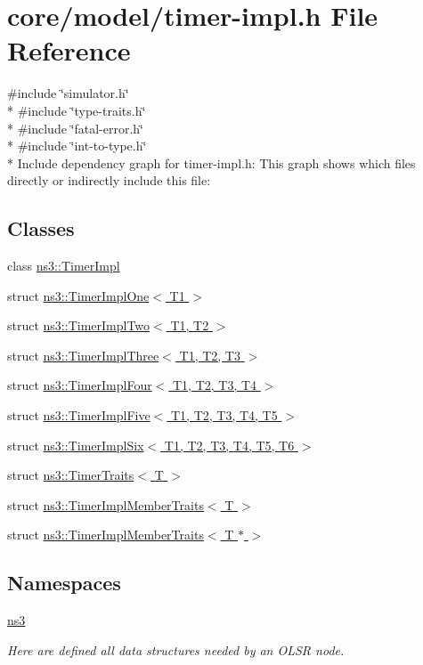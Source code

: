\hypertarget{timer-impl_8h}{}\section{core/model/timer-\/impl.h File Reference}
\label{timer-impl_8h}
{\ttfamily \#include \char`\"{}simulator.\+h\char`\"{}}\\*
{\ttfamily \#include \char`\"{}type-\/traits.\+h\char`\"{}}\\*
{\ttfamily \#include \char`\"{}fatal-\/error.\+h\char`\"{}}\\*
{\ttfamily \#include \char`\"{}int-\/to-\/type.\+h\char`\"{}}\\*
Include dependency graph for timer-\/impl.h\+:
This graph shows which files directly or indirectly include this file\+:
\subsection*{Classes}
\begin{DoxyCompactItemize}
\item 
class \hyperlink{classns3_1_1TimerImpl}{ns3\+::\+Timer\+Impl}
\item 
struct \hyperlink{structns3_1_1TimerImplOne}{ns3\+::\+Timer\+Impl\+One$<$ T1 $>$}
\item 
struct \hyperlink{structns3_1_1TimerImplTwo}{ns3\+::\+Timer\+Impl\+Two$<$ T1, T2 $>$}
\item 
struct \hyperlink{structns3_1_1TimerImplThree}{ns3\+::\+Timer\+Impl\+Three$<$ T1, T2, T3 $>$}
\item 
struct \hyperlink{structns3_1_1TimerImplFour}{ns3\+::\+Timer\+Impl\+Four$<$ T1, T2, T3, T4 $>$}
\item 
struct \hyperlink{structns3_1_1TimerImplFive}{ns3\+::\+Timer\+Impl\+Five$<$ T1, T2, T3, T4, T5 $>$}
\item 
struct \hyperlink{structns3_1_1TimerImplSix}{ns3\+::\+Timer\+Impl\+Six$<$ T1, T2, T3, T4, T5, T6 $>$}
\item 
struct \hyperlink{structns3_1_1TimerTraits}{ns3\+::\+Timer\+Traits$<$ T $>$}
\item 
struct \hyperlink{structns3_1_1TimerImplMemberTraits}{ns3\+::\+Timer\+Impl\+Member\+Traits$<$ T $>$}
\item 
struct \hyperlink{structns3_1_1TimerImplMemberTraits_3_01T_01_5_01_4}{ns3\+::\+Timer\+Impl\+Member\+Traits$<$ T $\ast$ $>$}
\end{DoxyCompactItemize}
\subsection*{Namespaces}
\begin{DoxyCompactItemize}
\item 
 \hyperlink{namespacens3}{ns3}
\begin{DoxyCompactList}\small\item\em Here are defined all data structures needed by an O\+L\+SR node. \end{DoxyCompactList}\end{DoxyCompactItemize}
